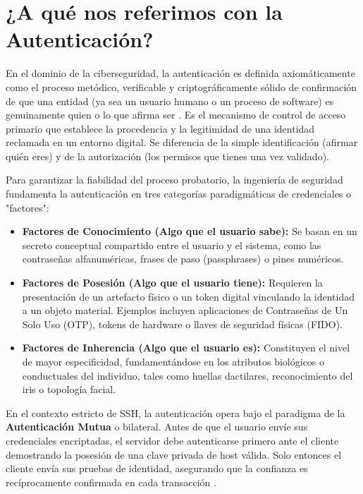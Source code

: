 \documentclass[a4paper,12pt]{article}
\begin{document}
\section{¿A qué nos referimos con la Autenticación?}

En el dominio de la ciberseguridad, la autenticación es definida axiomáticamente como el proceso metódico, verificable y criptográficamente sólido de confirmación de que una entidad (ya sea un usuario humano o un proceso de software) es genuinamente quien o lo que afirma ser \cite{fcca_autenticacion}. Es el mecanismo de control de acceso primario que establece la procedencia y la legitimidad de una identidad reclamada en un entorno digital. Se diferencia de la simple identificación (afirmar quién eres) y de la autorización (los permisos que tienes una vez validado).

Para garantizar la fiabilidad del proceso probatorio, la ingeniería de seguridad fundamenta la autenticación en tres categorías paradigmáticas de credenciales o "factores":
\begin{itemize}
    \item \textbf{Factores de Conocimiento (Algo que el usuario sabe):} Se basan en un secreto conceptual compartido entre el usuario y el sistema, como las contraseñas alfanuméricas, frases de paso (passphrases) o pines numéricos.
    \item \textbf{Factores de Posesión (Algo que el usuario tiene):} Requieren la presentación de un artefacto físico o un token digital vinculando la identidad a un objeto material. Ejemplos incluyen aplicaciones de Contraseñas de Un Solo Uso (OTP), tokens de hardware o llaves de seguridad físicas (FIDO).
    \item \textbf{Factores de Inherencia (Algo que el usuario es):} Constituyen el nivel de mayor especificidad, fundamentándose en los atributos biológicos o conductuales del individuo, tales como huellas dactilares, reconocimiento del iris o topología facial.
\end{itemize}

En el contexto estricto de SSH, la autenticación opera bajo el paradigma de la \textbf{Autenticación Mutua} o bilateral. Antes de que el usuario envíe sus credenciales encriptadas, el servidor debe autenticarse primero ante el cliente demostrando la posesión de una clave privada de host válida. Solo entonces el cliente envía sus pruebas de identidad, asegurando que la confianza es recíprocamente confirmada en cada transacción \cite{fcca_autenticacion}.
\end{document}
